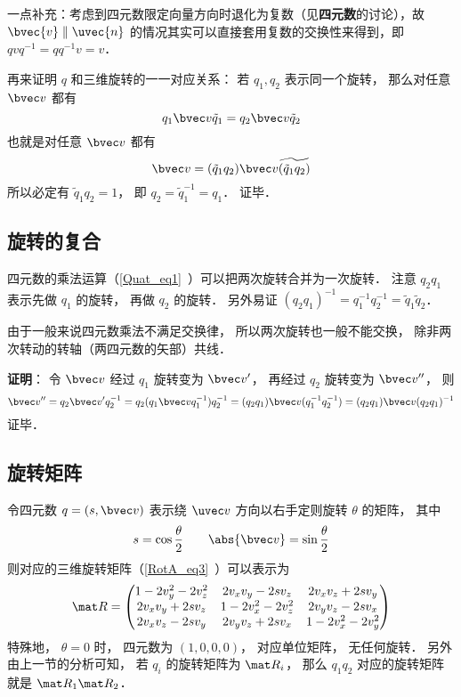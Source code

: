 一点补充：考虑到四元数限定向量方向时退化为复数（见\textbf{四元数}的讨论），故 $\bvec{v}\parallel{\uvec{n}}$ 的情况其实可以直接套用复数的交换性来得到，即 $qvq^{-1}=qq^{-1}v=v$．

再来证明 $q$ 和三维旋转的一一对应关系： 若 $q_1,q_2$ 表示同一个旋转， 那么对任意 $\bvec v$ 都有
\begin{equation}
q_1\bvec v \tilde q_1 = q_2\bvec v \tilde q_2
\end{equation}
也就是对任意 $\bvec v$ 都有
\begin{equation}
\bvec v = (\tilde q_1q_2)\bvec v \widetilde{(\tilde q_1q_2)}
\end{equation}
所以必定有 $\tilde q_1q_2 = 1$， 即 $q_2 = \tilde q_1^{-1} = q_1$． 证毕．

\subsection{旋转的复合}
四元数的乘法运算（\autoref{Quat_eq1}~）可以把两次旋转合并为一次旋转． 注意 $q_2q_1$ 表示先做 $q_1$ 的旋转， 再做 $q_2$ 的旋转． 另外易证 $(q_2q_1)^{-1} = q_1^{-1} q_2^{-1} = \tilde q_1\tilde q_2$．

由于一般来说四元数乘法不满足交换律， 所以两次旋转也一般不能交换， 除非两次转动的转轴（两四元数的矢部）共线．

\textbf{证明}： 令 $\bvec v$ 经过 $q_1$ 旋转变为 $\bvec v'$， 再经过 $q_2$ 旋转变为 $\bvec v''$， 则
\begin{equation}
\bvec v'' = q_2\bvec v'q_2^{-1} = q_2(q_1\bvec vq_1^{-1}) q_2^{-1} = (q_2q_1)\bvec v(q_1^{-1} q_2^{-1}) = (q_2q_1)\bvec v(q_2q_1)^{-1}
\end{equation}
证毕．

\subsection{旋转矩阵}
令四元数 $q = (s, \bvec v)$ 表示绕 $\uvec v$ 方向以右手定则旋转 $\theta$ 的矩阵， 其中
\begin{equation}
s = \cos\frac{\theta}{2} \qquad
\abs{\bvec v} = \sin\frac{\theta}{2}
\end{equation}
则对应的三维旋转矩阵（\autoref{RotA_eq3}~）可以表示为
\begin{equation}\label{QuatN_eq2}
\mat R =
\begin{pmatrix}
1 - 2v_y^2 - 2v_z^2 & 2v_xv_y - 2sv_z  & 2v_x v_z + 2s v_y\\
2v_x v_y + 2sv_z & 1 - 2v_x^2 - 2v_z^2 & 2v_y v_z - 2s v_x\\
2v_x v_z - 2s v_y & 2v_y v_z + 2s v_x & 1 - 2v_x^2 - 2v_y^2
\end{pmatrix}
\end{equation}
特殊地， $\theta = 0$ 时， 四元数为 $(1,0,0,0)$， 对应单位矩阵， 无任何旋转． 另外由上一节的分析可知， 若 $q_i$ 的旋转矩阵为 $\mat R_i$， 那么 $q_1q_2$ 对应的旋转矩阵就是 $\mat R_1\mat R_2$．

